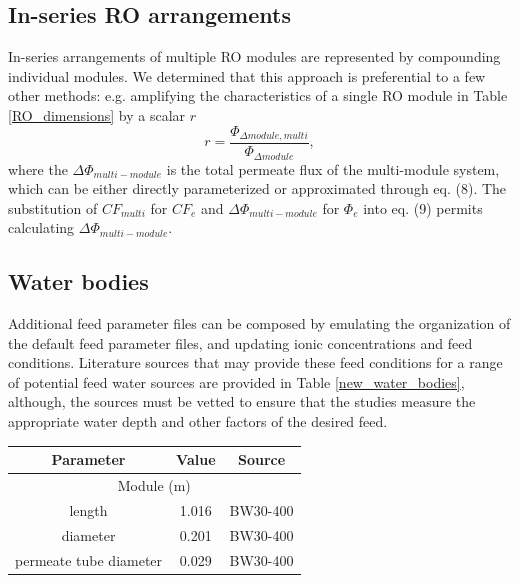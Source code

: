 \begin{supplementary}
\subsection{In-series RO arrangements}

In-series arrangements of multiple RO modules are represented by compounding individual modules. We determined that this approach is preferential to a few other methods: e.g. amplifying the characteristics of a single RO module in Table \ref{RO_dimensions} by a scalar $r$
\begin{equation}
    r=\frac{\Phi_{\Delta module,multi}}{\Phi_{\Delta module}},
\end{equation}
where the $\Delta \Phi_{multi-module}$ is the total permeate flux of the multi-module system, which can be either directly parameterized or approximated through eq. (8). The substitution of $CF_{multi}$ for $CF_e$ and $\Delta \Phi_{multi-module}$ for $\Phi_e$ into eq. (9) permits calculating $\Delta \Phi_{multi-module}$. 

\subsection{Water bodies}

Additional feed parameter files can be composed by emulating the organization of the default feed parameter files, and updating ionic concentrations and feed conditions. Literature sources that may provide these feed conditions for a range of potential feed water sources are provided in Table \ref{new_water_bodies}, although, the sources must be vetted to ensure that the studies measure the appropriate water depth and other factors of the desired feed. 

\begin{savenotes}
\begin{table}[!h]
    \centering
    \begin{tabular}{|c|c|c|}
        \toprule
        \textbf{Parameter} & \textbf{Value} & \textbf{Source} \\ \midrule
        
        \multicolumn{3}{c}{Module (m)} \\ \midrule
        length & 1.016 & BW30-400 \cite{2020FilmTecElement} \\ 
        diameter & 0.201 & BW30-400 \cite{2020FilmTecElement}\\
        permeate tube diameter & 0.029 & BW30-400 \cite{2020FilmTecElement}\\ \midrule 
        

\end{tabular}
\end{table}
\end{savenotes}
\end{supplementary}
